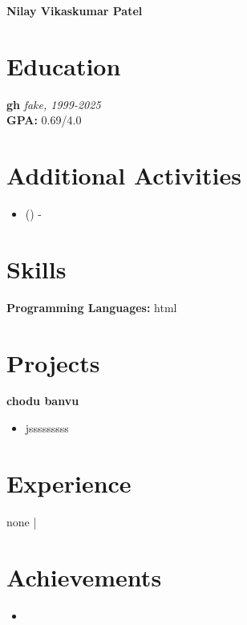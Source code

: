 \documentclass[10pt, letterpaper]{article}
\newenvironment{onecolentry}{}{} %
\newenvironment{highlights}{\begin{itemize}}{\end{itemize}} %
\begin{document}
\begin{center}
    {\LARGE\bfseries Nilay Vikaskumar Patel}\\[5pt]
    {}
\end{center}

\section{Education}
\begin{onecolentry}
    \textbf{gh} 
    \textit{fake, 1999-2025}\\
    \textbf{GPA:} 0.69/4.0
\end{onecolentry}

\section{Additional Activities}
\begin{onecolentry}
    \begin{highlights}
        \item \textbf{} () - 
    \end{highlights}
\end{onecolentry}

\section{Skills}
\textbf{Programming Languages:} html\\




\section{Projects}
\begin{onecolentry}
    {\textbf{\large chodu banvu}}
    \begin{itemize}
        \item jsssssssss
    \end{itemize}
\end{onecolentry}
\vspace{7pt}

\section{Experience}
\begin{onecolentry}
    \textbf{} \hfill none | 
\end{onecolentry}

\section{Achievements}
\begin{onecolentry}
    \begin{itemize}
        \item 
    \end{itemize}
\end{onecolentry}
\end{document}
